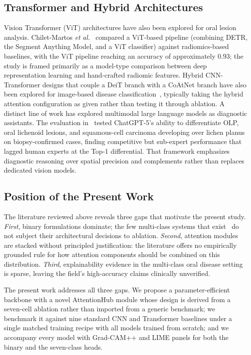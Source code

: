 \subsection{Transformer and Hybrid Architectures}

Vision Transformer (ViT) architectures have also been explored for oral lesion
analysis. Chilet-Martos \emph{et al.}~\cite{ref18} compared a ViT-based pipeline
(combining DETR, the Segment Anything Model, and a ViT classifier)
against radiomics-based baselines, with the ViT pipeline reaching an accuracy of
approximately $0.93$; the study is framed primarily as a model-type comparison
between deep representation learning and hand-crafted radiomic features.
Hybrid CNN-Transformer designs that couple a DeiT branch with a CoAtNet branch
have also been explored for image-based disease classification~\cite{ref21},
typically taking the hybrid attention configuration as given rather than testing
it through ablation. A distinct line of work has explored multimodal large
language models as diagnostic assistants. The evaluation in~\cite{ref24}
tested ChatGPT-5's ability to differentiate OLP, oral lichenoid lesions, and
squamous-cell carcinoma developing over lichen planus on biopsy-confirmed cases,
finding competitive but sub-expert performance that lagged human experts at the
Top-1 differential. That framework emphasizes diagnostic reasoning over spatial
precision and complements rather than replaces dedicated vision models.

\subsection{Position of the Present Work}

The literature reviewed above reveals three gaps that motivate the present
study. \emph{First}, binary formulations dominate; the few multi-class systems
that exist~\cite{ref19,ref22} do not subject their architectural decisions to
ablation. \emph{Second}, attention modules are stacked without principled
justification: the literature offers no empirically grounded rule for how
attention components should be combined on this distribution. \emph{Third},
explainability evidence in the multi-class oral disease setting is sparse,
leaving the field's high-accuracy claims clinically unverified.

The present work addresses all three gaps. We propose a parameter-efficient
backbone with a novel AttentionHub module whose design is derived from a
seven-cell ablation rather than imported from a generic benchmark; we benchmark
it against nine standard CNN and Transformer baselines under a single matched
training recipe with all models trained from scratch; and we accompany every
model with Grad-CAM++ and LIME panels for both the binary and the seven-class
heads.
